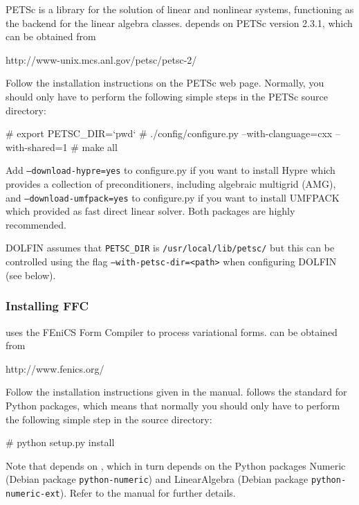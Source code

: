 PETSc is a library for the solution of linear and nonlinear systems, functioning
as the backend for the \dolfin{} linear algebra classes. \dolfin{} depends on 
PETSc version 2.3.1, which can be obtained from
\begin{code}
  http://www-unix.mcs.anl.gov/petsc/petsc-2/
\end{code}

Follow the installation instructions on the PETSc web page. Normally,
you should only have to perform the following simple steps in the PETSc
source directory:
\begin{code}
  # export PETSC_DIR=`pwd`
  # ./config/configure.py --with-clanguage=cxx --with-shared=1
  # make all
\end{code}

Add \texttt{--download-hypre=yes} to configure.py if you want to
install Hypre which provides a collection of preconditioners,
including algebraic multigrid (AMG), and 
\texttt{--download-umfpack=yes} to configure.py if you want to
install UMFPACK which provided as fast direct linear solver.
Both packages are highly recommended.

DOLFIN assumes that \texttt{PETSC\_DIR} is \texttt{/usr/local/lib/petsc/} but
this can be controlled using the flag \texttt{--with-petsc-dir=<path>} when 
configuring DOLFIN (see below).

\subsubsection{Installing FFC}

\dolfin{} uses the FEniCS Form Compiler \ffc{} to process variational
forms. \ffc{} can be obtained from
\begin{code}
  http://www.fenics.org/
\end{code}

Follow the installation instructions given in the \ffc{}
manual. \ffc{} follows the standard for Python packages, which means
that normally you should only have to perform the following simple step
in the \ffc{} source directory:
\begin{code}
  # python setup.py install
\end{code}

Note that \ffc{} depends on \fiat{} , which in turn depends on
the Python packages Numeric (Debian package \texttt{python-numeric}) and
LinearAlgebra (Debian package \texttt{python-numeric-ext}). Refer to
the \ffc{} manual for further details.

